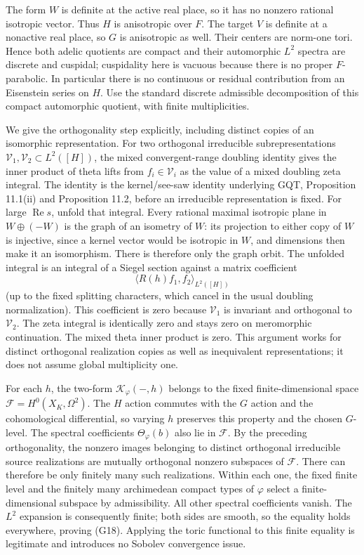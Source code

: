 \documentclass[11pt,a4paper]{article}
\theoremstyle{definition}
\begin{document}
The form \(W\) is definite at the active real place, so it has no nonzero rational isotropic vector. Thus \(H\) is anisotropic over \(F\). The target \(V\) is definite at a nonactive real place, so \(G\) is anisotropic as well. Their centers are norm-one tori. Hence both adelic quotients are compact and their automorphic \(L^2\) spectra are discrete and cuspidal; cuspidality here is vacuous because there is no proper \(F\)-parabolic. In particular there is no continuous or residual contribution from an Eisenstein series on \(H\). Use the standard discrete admissible decomposition of this compact automorphic quotient, with finite multiplicities.

We give the orthogonality step explicitly, including distinct copies of an isomorphic representation. For two orthogonal irreducible subrepresentations \(\mathcal V_1,\mathcal V_2\subset L^2([H])\), the mixed convergent-range doubling identity gives the inner product of theta lifts from \(f_i\in\mathcal V_i\) as the value of a mixed doubling zeta integral. The identity is the kernel/see-saw identity underlying GQT, Proposition 11.1(ii) and Proposition 11.2, before an irreducible representation is fixed. For large \(\operatorname{Re}s\), unfold that integral. Every rational maximal isotropic plane in \(W\oplus(-W)\) is the graph of an isometry of \(W\): its projection to either copy of \(W\) is injective, since a kernel vector would be isotropic in \(W\), and dimensions then make it an isomorphism. There is therefore only the graph orbit. The unfolded integral is an integral of a Siegel section against a matrix coefficient \[
\langle R(h)f_1,f_2\rangle_{L^2([H])}
\] (up to the fixed splitting characters, which cancel in the usual doubling normalization). This coefficient is zero because \(\mathcal V_1\) is invariant and orthogonal to \(\mathcal V_2\). The zeta integral is identically zero and stays zero on meromorphic continuation. The mixed theta inner product is zero. This argument works for distinct orthogonal realization copies as well as inequivalent representations; it does not assume global multiplicity one.

For each \(h\), the two-form \(\mathcal K_\varphi(-,h)\) belongs to the fixed finite-dimensional space \(\mathcal F=H^0(X_K,\Omega^2)\). The \(H\) action commutes with the \(G\) action and the cohomological differential, so varying \(h\) preserves this property and the chosen \(G\)-level. The spectral coefficients \(\Theta_\varphi(b)\) also lie in \(\mathcal F\). By the preceding orthogonality, the nonzero images belonging to distinct orthogonal irreducible source realizations are mutually orthogonal nonzero subspaces of \(\mathcal F\). There can therefore be only finitely many such realizations. Within each one, the fixed finite level and the finitely many archimedean compact types of \(\varphi\) select a finite-dimensional subspace by admissibility. All other spectral coefficients vanish. The \(L^2\) expansion is consequently finite; both sides are smooth, so the equality holds everywhere, proving (G18). Applying the toric functional to this finite equality is legitimate and introduces no Sobolev convergence issue.
\end{document}

